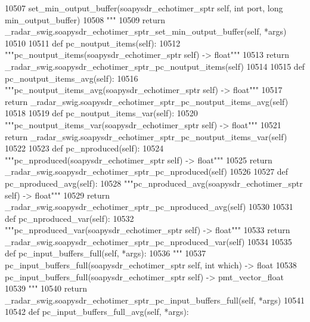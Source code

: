 \begin{DoxyCode}
{{{{{{{{{{{{{{{{{{{{{{{{{{{{{{{{{10507 \textcolor{stringliteral}{        set\_min\_output\_buffer(soapysdr\_echotimer\_sptr self, int port, long min\_output\_buffer)}
10508 \textcolor{stringliteral}{        """}
10509         \textcolor{keywordflow}{return} \_radar\_swig.soapysdr\_echotimer\_sptr\_set\_min\_output\_buffer(self, *args)
10510 
10511     \textcolor{keyword}{def }pc_noutput_items(self):
10512         \textcolor{stringliteral}{"""pc\_noutput\_items(soapysdr\_echotimer\_sptr self) -> float"""}
10513         \textcolor{keywordflow}{return} \_radar\_swig.soapysdr\_echotimer\_sptr\_pc\_noutput\_items(self)
10514 
10515     \textcolor{keyword}{def }pc_noutput_items_avg(self):
10516         \textcolor{stringliteral}{"""pc\_noutput\_items\_avg(soapysdr\_echotimer\_sptr self) -> float"""}
10517         \textcolor{keywordflow}{return} \_radar\_swig.soapysdr\_echotimer\_sptr\_pc\_noutput\_items\_avg(self)
10518 
10519     \textcolor{keyword}{def }pc_noutput_items_var(self):
10520         \textcolor{stringliteral}{"""pc\_noutput\_items\_var(soapysdr\_echotimer\_sptr self) -> float"""}
10521         \textcolor{keywordflow}{return} \_radar\_swig.soapysdr\_echotimer\_sptr\_pc\_noutput\_items\_var(self)
10522 
10523     \textcolor{keyword}{def }pc_nproduced(self):
10524         \textcolor{stringliteral}{"""pc\_nproduced(soapysdr\_echotimer\_sptr self) -> float"""}
10525         \textcolor{keywordflow}{return} \_radar\_swig.soapysdr\_echotimer\_sptr\_pc\_nproduced(self)
10526 
10527     \textcolor{keyword}{def }pc_nproduced_avg(self):
10528         \textcolor{stringliteral}{"""pc\_nproduced\_avg(soapysdr\_echotimer\_sptr self) -> float"""}
10529         \textcolor{keywordflow}{return} \_radar\_swig.soapysdr\_echotimer\_sptr\_pc\_nproduced\_avg(self)
10530 
10531     \textcolor{keyword}{def }pc_nproduced_var(self):
10532         \textcolor{stringliteral}{"""pc\_nproduced\_var(soapysdr\_echotimer\_sptr self) -> float"""}
10533         \textcolor{keywordflow}{return} \_radar\_swig.soapysdr\_echotimer\_sptr\_pc\_nproduced\_var(self)
10534 
10535     \textcolor{keyword}{def }pc_input_buffers_full(self, *args):
10536         \textcolor{stringliteral}{"""}
10537 \textcolor{stringliteral}{        pc\_input\_buffers\_full(soapysdr\_echotimer\_sptr self, int which) -> float}
10538 \textcolor{stringliteral}{        pc\_input\_buffers\_full(soapysdr\_echotimer\_sptr self) -> pmt\_vector\_float}
10539 \textcolor{stringliteral}{        """}
10540         \textcolor{keywordflow}{return} \_radar\_swig.soapysdr\_echotimer\_sptr\_pc\_input\_buffers\_full(self, *args)
10541 
10542     \textcolor{keyword}{def }pc_input_buffers_full_avg(self, *args):
}}}}}}}}}}}}}}}}}}}}}}}}}}}}}}}}}
\end{DoxyCode}
